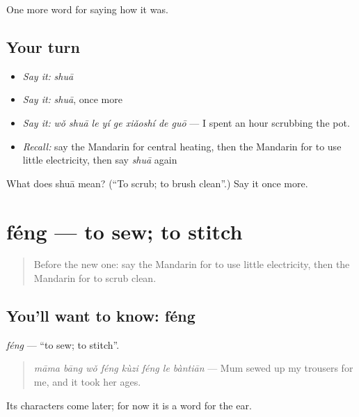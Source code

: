 \begin{grammarlens}[title={What you've built}]
One more word for saying how it was.
\end{grammarlens}

\subsection*{Your turn}
\begin{itemize}
\raggedright
  \item \emph{Say it:} \emph{shuā}
  \item \emph{Say it:} \emph{shuā}, once more
  \item \emph{Say it:} \emph{wǒ shuā le yí ge xiǎoshí de guō} — I spent an hour scrubbing the pot.
  \item \emph{Recall:} say the Mandarin for central heating, then the Mandarin for to use little electricity, then say \emph{shuā} again
\end{itemize}

\begin{tcolorbox}[breakable,colback=teal!4,colframe=teal!35!black,title={Before you move on}]
What does shuā mean? (\textquotedblleft{}To scrub; to brush clean\textquotedblright{}.) Say it once more.
\end{tcolorbox}
\section[féng]{féng — to sew; to stitch}

\label{lesson:ZH-C521-feng-sew}



\begin{quote}
Before the new one: say the Mandarin for to use little electricity, then the Mandarin for to scrub clean.
\end{quote}

\subsection*{You'll want to know: féng}
\emph{féng} — \textquotedblleft{}to sew; to stitch\textquotedblright{}.

\begin{quote}
\emph{māma bāng wǒ féng kùzi féng le bàntiān} — Mum sewed up my trousers for me, and it took her ages.
\end{quote}

Its characters come later; for now it is a word for the ear.

